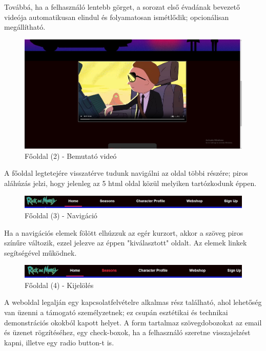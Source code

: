 \documentclass[12pt, titlepage]{article}
\begin{document}
\pagebreak

Továbbá, ha a felhasználó lentebb görget, a sorozat első évadának bevezető videója automatikusan elindul és folyamatosan ismétlődik; opcionálisan megállítható. 

\begin{figure}[!h]
	\centering
	\includegraphics[width=\linewidth]{images/home/2.jpg}
	\caption{Főoldal (2) - Bemutató videó}
\end{figure}

A főoldal legtetejére visszatérve tudunk navigálni az oldal többi részére; piros aláhúzás jelzi, hogy jelenleg az 5 html oldal közül melyiken tartózkodunk éppen.

\begin{figure}[!h]
	\centering
	\includegraphics[width=\linewidth]{images/home/3.jpg}
	\caption{Főoldal (3) - Navigáció} 
\end{figure}

Ha a navigációs elemek fölött elhúzzuk az egér kurzort, akkor a szöveg piros színűre változik, ezzel jelezve az éppen "kiválasztott" oldalt. Az elemek linkek segítségével működnek.

\begin{figure}[!h]
	\centering
	\includegraphics[width=\linewidth]{images/home/4.jpg}
	\caption{Főoldal (4) - Kijelölés} 
\end{figure}

\pagebreak
A weboldal legalján egy kapcsolatfelvételre alkalmas rész található, ahol lehetőség van üzenni a támogató személyzetnek; ez csupán esztétikai és technikai demonstrációs okokból kapott helyet.
A form tartalmaz szövegdobozokat az email és üzenet rögzítéséhez, egy check-boxok, ha a felhasználó szeretne visszajelzést kapni, illetve egy  radio button-t is.
\end{document}
